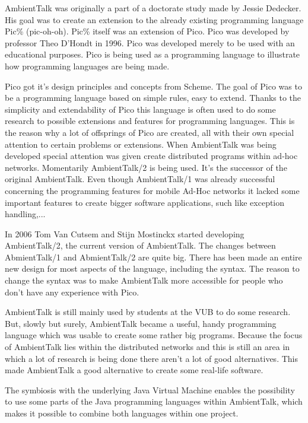 \documentclass[a4paper,12pt]{report}
\begin{document}
AmbientTalk was originally a part of a doctorate study made by Jessie Dedecker. His goal was to create an extension to the already existing programming language Pic\% (pic-oh-oh). Pic\% itself
was an extension of Pico. Pico was developed by professor Theo D'Hondt in 1996. Pico was developed merely to be used with an educational purposes. Pico is being used as a programming language to
illustrate how programming languages are being made.

Pico got it's design principles and concepts from Scheme. The goal of Pico was to be a programming language based on simple rules, easy to extend. Thanks to the simplicity and extendability of Pico
this language is often used to do some research to possible extensions and features for programming languages. This is the reason why a lot of offsprings of Pico are created, all with their own
special attention to certain problems or extensions. When AmbientTalk was being developed special attention was given create distributed programs within ad-hoc networks.
Momentarily AmbientTalk/2 is being used. It's the successor of the original AmbientTalk. Even though AmbientTalk/1 was already successful concerning the programming features for mobile Ad-Hoc
networks it lacked some important features to create bigger software applications, such like exception handling,...

In 2006 Tom Van Cutsem and Stijn Mostinckx started developing AmbientTalk/2, the current version of AmbientTalk. The changes between AbmientTalk/1 and AbmientTalk/2 are quite big. There has been
made an entire new design for most aspects of the language, including the syntax. The reason to change the syntax was to make AmbientTalk more accessible for people who don't have any experience
with Pico. 

AmbientTalk is still mainly used by students at the VUB to do some research. But, slowly but surely, AmbientTalk became a useful, handy programming language which was usable to create some
rather big programs. Because the focus of AmbientTalk lies within the distributed networks and this is still an area in which a lot of research is being done there aren't a lot of good alternatives.
This made AmbientTalk a good alternative to create some real-life software.

The symbiosis with the underlying Java Virtual Machine enables the possibility to use some parts of the Java programming languages within AmbientTalk, which makes it possible to combine both languages within
one project.
\end{document}
